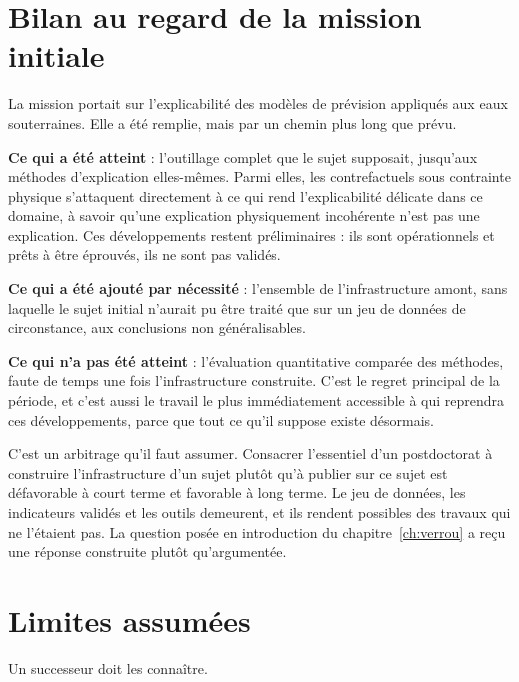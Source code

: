 \section{Bilan au regard de la mission initiale}

La mission portait sur l'explicabilité des modèles de prévision appliqués aux eaux souterraines.
Elle a été remplie, mais par un chemin plus long que prévu.

\textbf{Ce qui a été atteint} : l'outillage complet que le sujet supposait, jusqu'aux méthodes
d'explication elles-mêmes. Parmi elles, les contrefactuels sous contrainte physique s'attaquent
directement à ce qui rend l'explicabilité délicate dans ce domaine, à savoir qu'une explication
physiquement incohérente n'est pas une explication. Ces développements restent préliminaires :
ils sont opérationnels et prêts à être éprouvés, ils ne sont pas validés.

\textbf{Ce qui a été ajouté par nécessité} : l'ensemble de l'infrastructure amont, sans laquelle
le sujet initial n'aurait pu être traité que sur un jeu de données de circonstance, aux
conclusions non généralisables.

\textbf{Ce qui n'a pas été atteint} : l'évaluation quantitative comparée des méthodes, faute de
temps une fois l'infrastructure construite. C'est le regret principal de la période, et c'est
aussi le travail le plus immédiatement accessible à qui reprendra ces développements, parce
que tout ce qu'il suppose existe désormais.

C'est un arbitrage qu'il faut assumer. Consacrer l'essentiel d'un postdoctorat à construire
l'infrastructure d'un sujet plutôt qu'à publier sur ce sujet est défavorable à court terme et
favorable à long terme. Le jeu de données, les indicateurs validés et les outils demeurent, et
ils rendent possibles des travaux qui ne l'étaient pas. La question posée en introduction du
chapitre~\ref{ch:verrou} a reçu une réponse construite plutôt qu'argumentée.

\section{Limites assumées}

Un successeur doit les connaître.

